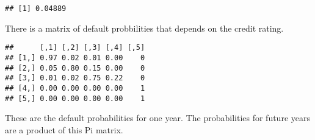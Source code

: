 \documentclass[12pt, a4paper, oneside]{article} %
\begin{document}
\begin{knitrout}
\color{fgcolor}\begin{kframe}
\begin{alltt}
 \hlkwb{<-} \hlstd{(}\hlstd{,} \hlstd{,} \hlstd{,} \hlstd{,} \hlstd{)\{}
   \hlkwb{<-}  \hlopt{*} \hlstd{(}\hlopt{+} \hlopt{*}  \hlopt{+} \hlstd{(} \hlopt{-}  \hlopt{*}  \hlopt{*} \hlopt{/}\hlopt{-}
\hlstd{\}}
 \hlkwb{<-} 
 \hlkwb{<-} 
 \hlkwb{<-} 
 \hlkwb{<-} 
 \hlkwb{<-} 
 \hlkwb{<-} 
\end{alltt}
\begin{verbatim}
## [1] 0.04889
\end{verbatim}
\end{kframe}
\end{knitrout}
There is a matrix of default probbilities that depends on the credit rating. 
\begin{knitrout}
\color{fgcolor}\begin{kframe}
\begin{alltt}
 \hlkwb{<-} \hlstd{()}
\hlstd{Pi[[}\hlstd{]]} \hlkwb{<-} \hlstd{(}\hlstd{(}\hlstd{,} \hlstd{,} \hlstd{,} \hlstd{,} \hlstd{,} \hlstd{,} \hlstd{,} \hlstd{,} \hlstd{,} \hlstd{,} \hlstd{,} \hlstd{,}
    \hlstd{,} \hlstd{,} \hlstd{,} \hlstd{,} \hlstd{,} \hlstd{,} \hlstd{,} \hlstd{,} \hlstd{,} \hlstd{,} \hlstd{,} \hlstd{,} \hlstd{),}  \hlstd{=} \hlstd{)}

\hlstd{Pi[[}\hlstd{]]}
\end{alltt}
\begin{verbatim}
##      [,1] [,2] [,3] [,4] [,5]
## [1,] 0.97 0.02 0.01 0.00    0
## [2,] 0.05 0.80 0.15 0.00    0
## [3,] 0.01 0.02 0.75 0.22    0
## [4,] 0.00 0.00 0.00 0.00    1
## [5,] 0.00 0.00 0.00 0.00    1
\end{verbatim}
\end{kframe}
\end{knitrout}
These are the default probabilities for one year.  The probabilities for future years are a product of this Pi matrix. 
\end{document}
